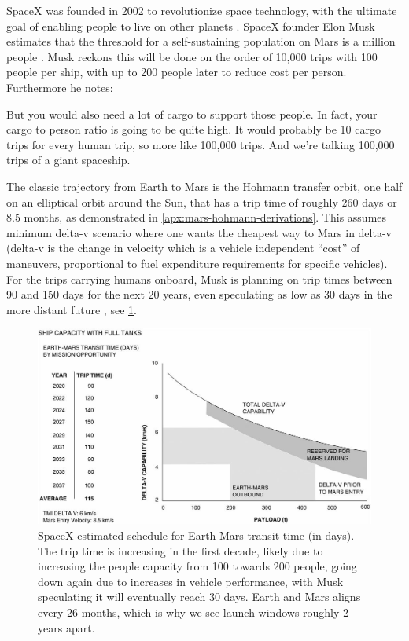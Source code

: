 SpaceX was founded in 2002 to revolutionize space technology, with the ultimate goal of enabling people to live on other planets \cite{SpaceXb}. SpaceX founder Elon Musk estimates that the threshold for a self-sustaining population on Mars is a million people \cite{Musk}. Musk reckons this will be done on the order of 10,000 trips with 100 people per ship, with up to 200 people later to reduce cost per person. Furthermore he notes:

\begin{displayquote}
But you would also need a lot of cargo to support those people. In fact, your cargo to person ratio is going to be quite high. It would probably be 10 cargo trips for every human trip, so more like 100,000 trips. And we’re talking 100,000 trips of a giant spaceship.
\end{displayquote}

The classic trajectory from Earth to Mars is the Hohmann transfer orbit, one half on an elliptical orbit around the Sun, that has a trip time of roughly 260 days or 8.5 months, as demonstrated in \cref{apx:mars-hohmann-derivations}. This assumes minimum delta-v scenario where one wants the cheapest way to Mars in delta-v (delta-v is the change in velocity which is a vehicle independent ``cost'' of maneuvers, proportional to fuel expenditure requirements for specific vehicles). For the trips carrying humans onboard, Musk is planning on trip times between 90 and 150 days for the next 20 years, even speculating as low as 30 days in the more distant future \cite{Musk}, see \cref{fig:musk-trip-time}.

\begin{figure}[ht]
	\centering
	\includegraphics[width=1.0\linewidth]{fig/musk-trip-time.jpg}
	\caption{SpaceX estimated schedule for Earth-Mars transit time (in days). The trip time is increasing in the first decade, likely due to increasing the people capacity from 100 towards 200 people, going down again due to increases in vehicle performance, with Musk speculating it will eventually reach 30 days. Earth and Mars aligns every 26 months, which is why we see launch windows roughly 2 years apart.}
	\label{fig:musk-trip-time}
\end{figure}

